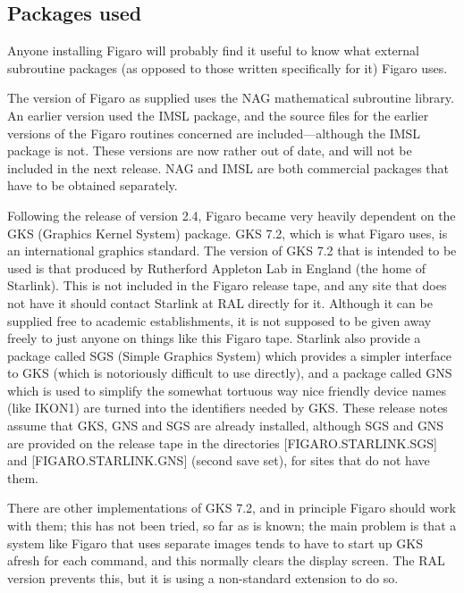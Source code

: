 \subsection{Packages used}

Anyone installing Figaro will probably find it useful to know what 
external subroutine packages (as opposed to those written specifically
for it) Figaro uses.

The version of Figaro as supplied uses the NAG mathematical subroutine library.
An earlier version used the IMSL package, and the source files for the earlier
versions of the Figaro routines concerned are included---although the IMSL
package is not. These versions are now rather out of date, and will not be
included in the next release. NAG and IMSL are both commercial packages that
have to be obtained separately.

Following the release of version 2.4, Figaro became very heavily dependent on
the GKS (Graphics Kernel System) package. GKS 7.2, which is what Figaro uses, 
is an international graphics standard. The version of GKS 7.2 that is intended
to be used is that produced by Rutherford Appleton Lab in England (the home of
Starlink). This is not included in the Figaro release tape, and any site that
does not have it should contact Starlink at RAL directly for it.  Although it
can be supplied free to academic establishments, it is not supposed to be given
away freely to just anyone on things like this Figaro  tape. Starlink also
provide a package called SGS (Simple Graphics System) which provides a simpler
interface to GKS (which is notoriously difficult to use directly), and a
package called GNS which is used to simplify the somewhat tortuous way nice
friendly device names (like IKON1) are  turned into the identifiers needed by
GKS. These release notes assume that GKS, GNS and SGS are already installed,
although SGS and GNS are provided  on the release tape in the directories
[FIGARO.STARLINK.SGS] and [FIGARO.STARLINK.GNS] (second save set), for sites
that do not have them.

There are other implementations of GKS 7.2, and in principle Figaro  should
work with them; this has not been tried, so far as is known; the main problem
is that a system like Figaro that uses separate images tends to have to start
up GKS afresh for each command, and this normally clears the display screen.
The RAL version prevents this, but it is using a non-standard extension to do
so.

